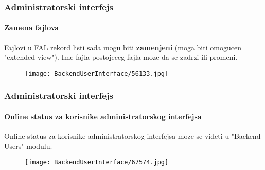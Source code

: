 \begin{frame}[fragile]
	\frametitle{Administratorski interfejs}
	\framesubtitle{Zamena fajlova}

	Fajlovi u FAL rekord listi sada mogu biti \textbf{zamenjeni} (moga biti omogucen "extended view"). Ime fajla postojeceg fajla moze da se zadrzi ili promeni.

	\begin{figure}
		\texttt{[image: BackendUserInterface/56133.jpg]}
	\end{figure}

\end{frame}

\begin{frame}[fragile]
	\frametitle{Administratorski interfejs}
	\framesubtitle{Online status za korisnike administratorskog interfejsa}

	Online status za korisnike administratorskog interfejsa moze se videti u "Backend Users" modulu.

	\begin{figure}
		\texttt{[image: BackendUserInterface/67574.jpg]}
	\end{figure}

\end{frame}

